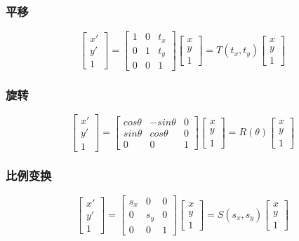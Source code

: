 \documentclass{article}
\begin{document}
\begin{CJK}{UTF8}{gbsn}
	\subsubsection{平移}
	$$\begin{bmatrix}
	x'\\y'\\1	
	\end{bmatrix}=\begin{bmatrix}
	1&0&t_x\\0&1&t_y\\0&0&1
	\end{bmatrix}
	\begin{bmatrix}
	x\\y\\1
	\end{bmatrix}=T(t_x,t_y)\begin{bmatrix}
	x\\y\\1
	\end{bmatrix}
	$$
	\subsubsection{旋转}
	$$\begin{bmatrix}
	x'\\y'\\1	
	\end{bmatrix}=\begin{bmatrix}
	cos\theta&-sin\theta&0\\sin\theta&cos\theta&0\\0&0&1
	\end{bmatrix}
	\begin{bmatrix}
	x\\y\\1
	\end{bmatrix}=R(\theta)\begin{bmatrix}
	x\\y\\1
	\end{bmatrix}
	$$
	\subsubsection{比例变换}
	$$\begin{bmatrix}
	x'\\y'\\1	
	\end{bmatrix}=\begin{bmatrix}
	s_x&0&0\\0&s_y&0\\0&0&1
	\end{bmatrix}
	\begin{bmatrix}
	x\\y\\1
	\end{bmatrix}=S(s_x,s_y)\begin{bmatrix}
	x\\y\\1
	\end{bmatrix}
	$$

\end{CJK}
\end{document}
